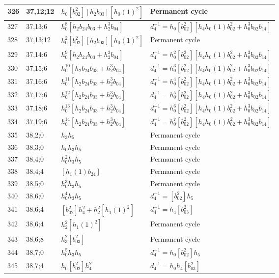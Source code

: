 \documentclass{article}
\begin{document}
\begin{longtable}{|l|l|>{\raggedright\arraybackslash}p{6cm}|>{\raggedright\arraybackslash}p{6cm}|}
\hline
326 & 37,12;12 & $h_0[b_{02}^2][h_2b_{03}][h_0(1)^2]$ & Permanent cycle\\
\hline
327 & 37,13;6 & $h_0^8[h_2b_{24}b_{03} + h_2^3b_{04}]$ & $d_{4}^{-1}=h_0[b_{02}^2][h_4h_0(1)b_{02}^2 + h_0^3b_{02}b_{14}]$\\
\hline
328 & 37,13;12 & $h_0^2[b_{02}^2][h_2b_{03}][h_0(1)^2]$ & Permanent cycle\\
\hline
329 & 37,14;6 & $h_0^9[h_2b_{24}b_{03} + h_2^3b_{04}]$ & $d_{4}^{-1}=h_0^2[b_{02}^2][h_4h_0(1)b_{02}^2 + h_0^3b_{02}b_{14}]$\\
\hline
330 & 37,15;6 & $h_0^{10}[h_2b_{24}b_{03} + h_2^3b_{04}]$ & $d_{4}^{-1}=h_0^3[b_{02}^2][h_4h_0(1)b_{02}^2 + h_0^3b_{02}b_{14}]$\\
\hline
331 & 37,16;6 & $h_0^{11}[h_2b_{24}b_{03} + h_2^3b_{04}]$ & $d_{4}^{-1}=h_0^4[b_{02}^2][h_4h_0(1)b_{02}^2 + h_0^3b_{02}b_{14}]$\\
\hline
332 & 37,17;6 & $h_0^{12}[h_2b_{24}b_{03} + h_2^3b_{04}]$ & $d_{4}^{-1}=h_0^5[b_{02}^2][h_4h_0(1)b_{02}^2 + h_0^3b_{02}b_{14}]$\\
\hline
333 & 37,18;6 & $h_0^{13}[h_2b_{24}b_{03} + h_2^3b_{04}]$ & $d_{4}^{-1}=h_0^6[b_{02}^2][h_4h_0(1)b_{02}^2 + h_0^3b_{02}b_{14}]$\\
\hline
334 & 37,19;6 & $h_0^{14}[h_2b_{24}b_{03} + h_2^3b_{04}]$ & $d_{4}^{-1}=h_0^7[b_{02}^2][h_4h_0(1)b_{02}^2 + h_0^3b_{02}b_{14}]$\\
\hline
335 & 38,2;0 & $h_3h_5$ & Permanent cycle\\
\hline
336 & 38,3;0 & $h_0h_3h_5$ & Permanent cycle\\
\hline
337 & 38,4;0 & $h_0^2h_3h_5$ & Permanent cycle\\
\hline
338 & 38,4;4 & $[h_1(1)b_{24}]$ & Permanent cycle\\
\hline
339 & 38,5;0 & $h_0^3h_3h_5$ & Permanent cycle\\
\hline
340 & 38,6;0 & $h_0^4h_3h_5$ & $d_{4}^{-1}=[b_{02}^2]h_5$\\
\hline
341 & 38,6;4 & $[b_{02}^2]h_4^2 + h_2^2[h_1(1)^2]$ & $d_{4}^{-1}=h_4[b_{03}^2]$\\
342 & 38,6;4 & $h_2^2[h_1(1)^2]$ & Permanent cycle\\
\hline
343 & 38,6;8 & $h_3^2[b_{03}^2]$ & Permanent cycle\\
\hline
344 & 38,7;0 & $h_0^5h_3h_5$ & $d_{4}^{-1}=h_0[b_{02}^2]h_5$\\
\hline
345 & 38,7;4 & $h_0[b_{02}^2]h_4^2$ & $d_{4}^{-1}=h_0h_4[b_{03}^2]$\\

\end{longtable}
\end{document}
